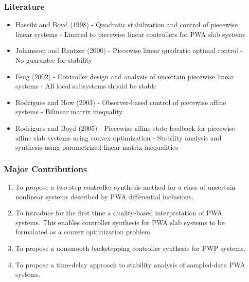 \documentclass{beamer}
\newcommand{\red}{\color[rgb]{1,0,0}}
\begin{document}
  \frame
  {
    \frametitle{Literature}
    \begin{itemize}
    \item Hassibi and Boyd (1998) - Quadratic stabilization and control of piecewise linear systems - {\red Limited to piecewise linear controllers} for PWA slab systems
    \item Johansson and Rantzer (2000) - Piecewise linear quadratic optimal control - {\red No guarantee for stability}
    \item Feng (2002) - Controller design and analysis of uncertain piecewise linear systems - {\red All local subsystems should be stable}
    \item Rodrigues and How (2003) - Observer-based control of piecewise affine systems - {\red Bilinear matrix inequality}
    \item Rodrigues and Boyd (2005) - Piecewise affine state feedback for piecewise affine slab systems using convex optimization -  Stability analysis and synthesis using {\red parametrized linear matrix inequalities}
    \end{itemize}
}

  \frame
  {
    \frametitle{Major Contributions}
\begin{enumerate}
\item To propose a two-step controller synthesis method for a class of uncertain nonlinear systems described by PWA differential inclusions.
\item To introduce for the first time a duality-based interpretation of PWA systems. This enables controller synthesis for PWA slab systems to be formulated as a convex optimization problem. 
\item To propose a nonsmooth backstepping controller synthesis for PWP systems. 
\item To propose a time-delay approach to stability analysis of sampled-data PWA systems.
\end{enumerate}
}
\end{document}
